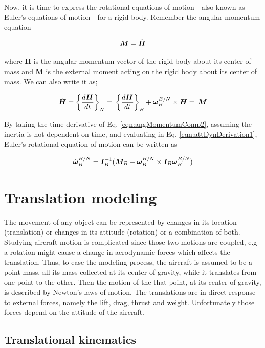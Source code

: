 Now, it is time to express the rotational equations of motion - also  known as Euler's equations of motion - for a rigid body.  Remember the angular momentum equation

\begin{equation}{\label{eqn:angMomentumComp}}
\bm{M} = \dot{\bm{H}} 
\end{equation}

where $\bm{H}$ is the angular momentum vector of the rigid body about its center of mass and  $\bm{M}$ is the external moment acting on the rigid body about its center of mass.  We can also write it as;

\begin{equation}{\label{eqn:attDynDerivation1}}
\dot{\bm{H}} = \bigg\{ \frac{d\bm{H}}{dt} \bigg\}_N 
=\,
\bigg\{ \frac{d\bm{H}}{dt} \bigg\}_B  + \bm{\omega}_B^{B/N} \times \bm{H}
 =\,
  \bm{M}
\end{equation}

By taking the time derivative of Eq. \ref{eqn:angMomentumComp2}, assuming the inertia is not dependent on time, and evaluating in  Eq. \ref{eqn:attDynDerivation1}, Euler's rotational equation of motion can be written as 

\begin{equation}{\label{eqn:kinematicEquDQM}}
\dot{\bm{\omega}}_B^{B/N}  = \bm{I}_B^{-1} (\bm{M}_B - \bm{\omega}_B^{B/N} \times \bm{I}_B \bm{\omega}_B^{B/N}) 
\end{equation}

\section{Translation modeling}

The movement of any object can be represented by changes in its location (translation) or changes in its attitude (rotation) or a combination of both. 
Studying aircraft motion is complicated since those two motions are coupled, e.g a rotation might cause a change in aerodynamic forces which affects the translation. 
Thus, to ease the modeling process, the aircraft is assumed to be a point mass, all its mass collected at its center of gravity, while it translates from one point to the other.
Then the motion of the that point, at its center of gravity, is described by Newton's laws of motion.
The translations are in direct response to external forces, namely the lift, drag, thrust and weight.
Unfortunately those forces depend on the attitude of the aircraft.

\subsection{Translational kinematics}

